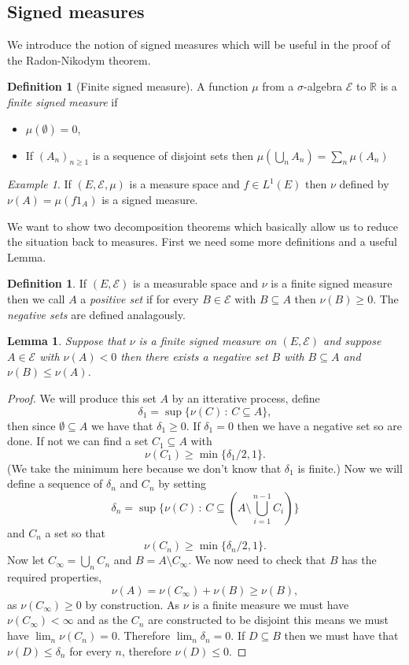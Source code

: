 \documentclass[11pt]{article}
\newtheorem{lem}[thm]{Lemma}
\theoremstyle{definition}
\newtheorem{dfn}[thm]{Definition}
\theoremstyle{remark}
\newtheorem{ex}[thm]{Example}
\begin{document}
\subsection{Signed measures}

We introduce the notion of signed measures which will be useful in the proof of the Radon-Nikodym theorem. 
\begin{dfn}[Finite signed measure]
A function $\mu$ from a $\sigma$-algebra $\mathcal{E}$ to $\mathbb{R}$ is a \emph{finite signed measure} if
\begin{itemize}
\item $\mu(\emptyset) = 0$,
\item If $(A_n)_{n \geq 1}$ is a sequence of disjoint sets then $\mu (\bigcup_n A_n) = \sum_n \mu(A_n)$
\end{itemize}
\end{dfn}
\begin{ex}
If $(E, \mathcal{E}, \mu)$ is a measure space and $f \in L^1(E)$ then $\nu$ defined by $\nu(A) = \mu(f1_A)$ is a signed measure.
\end{ex}

We want to show two decomposition theorems which basically allow us to reduce the situation back to measures. First we need some more definitions and a useful Lemma.
\begin{dfn}
If $(E, \mathcal{E})$ is a measurable space and $\nu$ is a finite signed measure then we call $A$ a \emph{positive set} if for every $B \in \mathcal{E}$ with $B \subseteq A$ then $\nu(B) \geq 0$. The \emph{negative sets} are defined analagously.
\end{dfn}
\begin{lem}
Suppose that $\nu$ is a finite signed measure on $(E, \mathcal{E})$ and suppose $A \in \mathcal{E}$ with $\nu(A) <0$ then there exists a negative set $B$ with $B \subseteq A$ and $\nu(B) \leq \nu(A)$. 
\end{lem}
\begin{proof}
We will produce this set $A$ by an itterative process, define
\[ \delta_1 = \sup \{ \nu(C) \,:\, C \subseteq A\}, \] then since $\emptyset \subseteq A$ we have that $\delta_1 \geq 0$. If $\delta_1 = 0$ then we have a negative set so are done. If not we can find a set $C_1 \subseteq A$ with 
\[ \nu(C_1) \geq \min\{\delta_1/2 ,1\}. \] (We take the minimum here because we don't know that $\delta_1$ is finite.) Now we will define a sequence of $\delta_n$ and $C_n$ by setting
\[ \delta_n = \sup\{ \nu(C) \,:\, C \subseteq (A \setminus \bigcup_{i=1}^{n-1}C_i)\} \] and $C_n$ a set so that 
\[ \nu(C_n) \geq \min\{ \delta_n /2 ,1\}. \] Now let $C_\infty = \bigcup_n C_n$ and $B = A \setminus C_\infty$. We now need to check that $B$ has the required properties,
\[ \nu(A) = \nu(C_\infty) + \nu(B) \geq \nu(B), \] as $\nu(C_\infty) \geq 0$ by construction.
As $\nu$ is a finite measure we must have $\nu(C_\infty) < \infty$ and as the $C_n$ are constructed to be disjoint this means we must have $\lim_n \nu(C_n) = 0$. Therefore $\lim_n \delta_n = 0$. If $D \subseteq B$ then we must have that $\nu(D) \leq \delta_n$ for every $n$, therefore $\nu(D) \leq 0$.
\end{proof}
\end{document}
